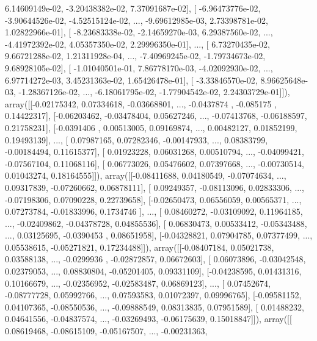 \documentclass{article}
\begin{document}
          6.14609149e-02,  -3.20438382e-02,   7.37091687e-02],
       [ -6.96473776e-02,  -3.90644526e-02,  -4.52515124e-02, ...,
         -9.69612985e-03,   2.73398781e-02,   1.02822966e-01],
       [ -8.23683338e-02,  -2.14659270e-03,   6.29387560e-02, ...,
         -4.41972392e-02,   4.05357350e-02,   2.29996350e-01],
       ..., 
       [  6.73270435e-02,   9.66721288e-02,   1.21311928e-04, ...,
         -7.40969245e-02,  -1.79734673e-02,   9.68928105e-02],
       [ -1.01040501e-01,   7.86778170e-03,  -4.02092930e-02, ...,
          6.97714272e-03,   3.45231363e-02,   1.65426478e-01],
       [ -3.33846570e-02,   8.96625648e-03,  -1.28367126e-02, ...,
         -6.18061795e-02,  -1.77904542e-02,   2.24303729e-01]]), array([[-0.02175342,  0.07334618, -0.03668801, ..., -0.0437874 ,
        -0.085175  ,  0.14422317],
       [-0.06203462, -0.03478404,  0.05627246, ..., -0.07413768,
        -0.06188597,  0.21758231],
       [-0.0391406 ,  0.00513005,  0.09169874, ...,  0.00482127,
         0.01852199,  0.19493139],
       ..., 
       [ 0.07987165,  0.07282346, -0.00147933, ...,  0.08383799,
        -0.00184494,  0.11615377],
       [ 0.01923228,  0.06031268,  0.00510794, ..., -0.04099421,
        -0.07567104,  0.11068116],
       [ 0.06773026,  0.05476602,  0.07397668, ..., -0.00730514,
         0.01043274,  0.18164555]]), array([[-0.08411688,  0.04180549, -0.07074634, ...,  0.09317839,
        -0.07260662,  0.06878111],
       [ 0.09249357, -0.08113096,  0.02833306, ..., -0.07198306,
         0.07090228,  0.22739658],
       [-0.02650473,  0.06556059,  0.00565371, ...,  0.07273784,
        -0.01833996,  0.1734746 ],
       ..., 
       [ 0.08460272, -0.03109092,  0.11964185, ..., -0.02409862,
        -0.04378728,  0.04855536],
       [ 0.06830473,  0.00533412, -0.05343488, ...,  0.03125695,
        -0.0390453 ,  0.08651958],
       [-0.04328821,  0.07904785,  0.07377499, ...,  0.05538615,
        -0.05271821,  0.17234488]]), array([[-0.08407184,  0.05021738,  0.03588138, ..., -0.0299936 ,
        -0.02872857,  0.06672603],
       [ 0.06073896, -0.03042548,  0.02379053, ...,  0.08830804,
        -0.05201405,  0.09331109],
       [-0.04238595,  0.01431316,  0.10166679, ..., -0.02356952,
        -0.02583487,  0.06869123],
       ..., 
       [ 0.07452674, -0.08777728,  0.05992766, ...,  0.07593583,
         0.01072397,  0.09996765],
       [-0.09581152,  0.04107365, -0.08550536, ..., -0.09888549,
         0.08313835,  0.07951589],
       [ 0.01488232,  0.04641556, -0.04837574, ..., -0.03269493,
        -0.06175639,  0.15018847]]), array([[ 0.08619468, -0.08615109, -0.05167507, ..., -0.00231363,
\end{document}
